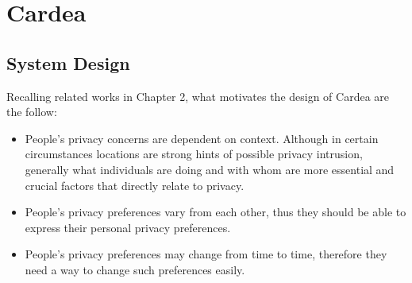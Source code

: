 \chapter{Cardea}\label{sec-cardea}

\section{System Design}
Recalling related works in Chapter 2, what motivates the design of Cardea are the follow:

\begin{itemize}
\item People's privacy concerns are dependent on context. Although in certain circumstances locations are strong hints of possible privacy intrusion, generally what individuals are doing and with whom are more essential and crucial factors that directly relate to privacy.
\item People's privacy preferences vary from each other, thus they should be able to express their personal privacy preferences.
\item People's privacy preferences may change from time to time, therefore they need a way to change such preferences easily.
\end{itemize}


